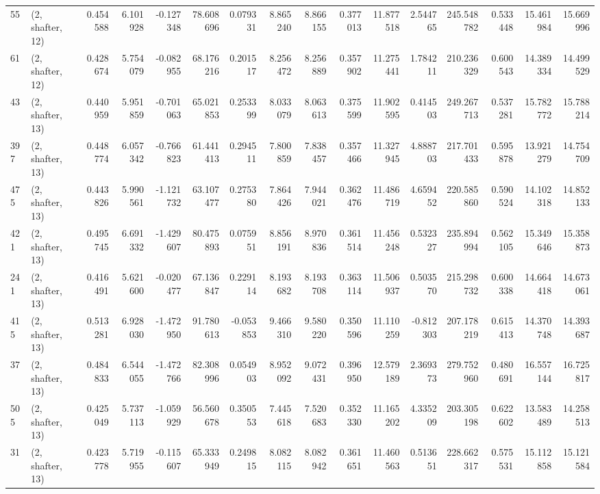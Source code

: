 \begin{tabular}{llrrrrrrrrrrrrrr}
55  &  (2, shafter, 12) &   0.454588 &   6.101928 &  -0.127348 &    78.608696 &   0.079331 &   8.865240 &   8.866155 &  0.377013 &  11.877518 &   2.544765 &   245.548782 &  0.533448 &  15.461984 &  15.669996 \\
61  &  (2, shafter, 12) &   0.428674 &   5.754079 &  -0.082955 &    68.176216 &   0.201517 &   8.256472 &   8.256889 &  0.357902 &  11.275441 &   1.784211 &   210.236329 &  0.600543 &  14.389334 &  14.499529 \\
43  &  (2, shafter, 13) &   0.440959 &   5.951859 &  -0.701063 &    65.021853 &   0.253399 &   8.033079 &   8.063613 &  0.375599 &  11.902595 &   0.414503 &   249.267713 &  0.537281 &  15.782772 &  15.788214 \\
397 &  (2, shafter, 13) &   0.448774 &   6.057342 &  -0.766823 &    61.441413 &   0.294511 &   7.800859 &   7.838457 &  0.357466 &  11.327945 &   4.888703 &   217.701433 &  0.595878 &  13.921279 &  14.754709 \\
475 &  (2, shafter, 13) &   0.443826 &   5.990561 &  -1.121732 &    63.107477 &   0.275380 &   7.864426 &   7.944021 &  0.362476 &  11.486719 &   4.659452 &   220.585860 &  0.590524 &  14.102318 &  14.852133 \\
421 &  (2, shafter, 13) &   0.495745 &   6.691332 &  -1.429607 &    80.475893 &   0.075951 &   8.856191 &   8.970836 &  0.361514 &  11.456248 &   0.532327 &   235.894994 &  0.562105 &  15.349646 &  15.358873 \\
241 &  (2, shafter, 13) &   0.416491 &   5.621600 &  -0.020477 &    67.136847 &   0.229114 &   8.193682 &   8.193708 &  0.363114 &  11.506937 &   0.503570 &   215.298732 &  0.600338 &  14.664418 &  14.673061 \\
415 &  (2, shafter, 13) &   0.513281 &   6.928030 &  -1.472950 &    91.780613 &  -0.053853 &   9.466310 &   9.580220 &  0.350596 &  11.110259 &  -0.812303 &   207.178219 &  0.615413 &  14.370748 &  14.393687 \\
37  &  (2, shafter, 13) &   0.484833 &   6.544055 &  -1.472766 &    82.308996 &   0.054903 &   8.952092 &   9.072431 &  0.396950 &  12.579189 &   2.369373 &   279.752960 &  0.480691 &  16.557144 &  16.725817 \\
505 &  (2, shafter, 13) &   0.425049 &   5.737113 &  -1.059929 &    56.560678 &   0.350553 &   7.445618 &   7.520683 &  0.352330 &  11.165202 &   4.335209 &   203.305198 &  0.622602 &  13.583489 &  14.258513 \\
31  &  (2, shafter, 13) &   0.423778 &   5.719955 &  -0.115607 &    65.333949 &   0.249815 &   8.082115 &   8.082942 &  0.361651 &  11.460563 &   0.513651 &   228.662317 &  0.575531 &  15.112858 &  15.121584 \\

\end{tabular}
